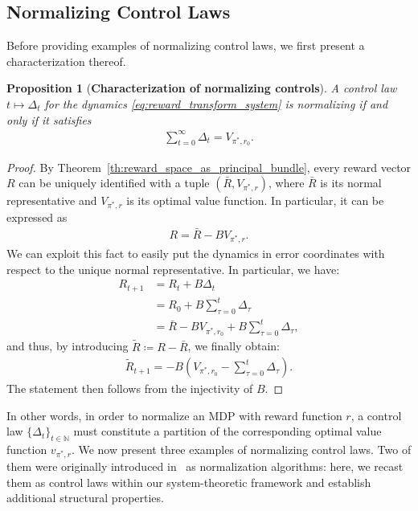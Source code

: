 \documentclass[10pt,leqno]{amsart}
\newcommand{\N}{\mathbb{N}}
\newcommand{\cost}{r}
\newcommand{\vvarg}[1]{v_{#1}}
\newcommand{\Vsym}{V}
\newcommand{\Varg}[1]{\Vsym_{#1}}
\newcommand{\Cost}{R}
\newcommand{\policy}{\pi}
\newtheorem{proposition}[theorem]{Proposition}
\begin{document}
\subsection{Normalizing Control Laws}
\label{subsec:section_2B}
Before providing examples of normalizing control laws, we first present a characterization thereof.
\begin{proposition}[\textbf{Characterization of normalizing controls}]\label{cor:necessary_sufficien_condition_for_normalizing_control}
    A control law $t \mapsto \Delta_t$ for the dynamics \eqref{eq:reward_transform_system} is normalizing if and only if it satisfies
    \begin{align*}
        \sum_{t = 0}^\infty \Delta_t = \Varg{\policy^*\!, \cost_0}.
    \end{align*}
\end{proposition}
\begin{proof}
    By Theorem~\ref{th:reward_space_as_principal_bundle}, every reward vector $\Cost$ can be uniquely identified with a tuple $(\bar{\Cost}, \Varg{\policy^*\!, \cost})$, where $\bar{\Cost}$ is its normal representative and $\Varg{\policy^*\!, \cost}$ is its optimal value function. In particular, it can be expressed as
    \begin{align*}
        R = \bar{R} - B \Varg{\policy^*\!, \cost}.
    \end{align*}
    We can exploit this fact to easily put the dynamics in error coordinates with respect to the unique normal representative. In particular, we have:
    \begin{align*}
        \Cost_{t+1} &= \Cost_t + B \Delta_t\\
        &= \Cost_0 + B \sum_{\tau = 0}^t \Delta_\tau\\
        &= \bar{\Cost} - B \Varg{\policy^*\!, \cost_0} + B\sum_{\tau = 0}^t \Delta_\tau,
    \end{align*}
    and thus, by introducing $\tilde{\Cost} \coloneqq \Cost - \bar{\Cost}$, we finally obtain:
    \begin{align}\label{eq:dynamics_error_coordinates}
        \tilde{\Cost}_{t + 1} = - B \left(\Varg{\policy^*\!, \cost_0} - \sum_{\tau = 0}^t \Delta_\tau\right).
    \end{align}
    The statement then follows from the injectivity of $B$.
\end{proof}
\noindent
In other words, in order to normalize an MDP with reward function $\cost$, a control law $\{\Delta_t\}_{t \in \N}$ must constitute a partition of the corresponding optimal value function $\vvarg{\policy^*\!, \cost}$. We now present three examples of normalizing control laws. Two of them were originally introduced in~\cite{mustafin2025mdpgeometrynormalizationreward} as normalization algorithms: here, we recast them as control laws within our system-theoretic framework and establish additional structural properties.
\end{document}
